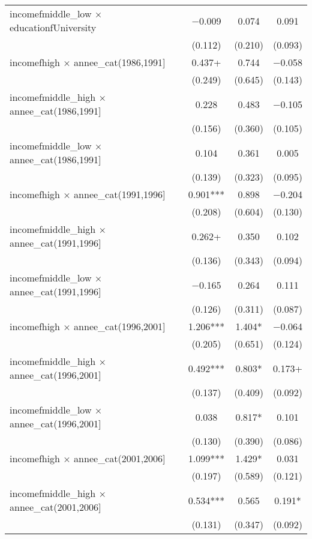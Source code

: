 \begin{table}
\begin{tabular}[t]{lccc}
incomefmiddle\_low × educationfUniversity & \num{-0.009} & \num{0.074} & \num{0.091}\\
 & (\num{0.112}) & (\num{0.210}) & (\num{0.093})\\
incomefhigh × annee\_cat(1986,1991] & \num{0.437}+ & \num{0.744} & \num{-0.058}\\
 & (\num{0.249}) & (\num{0.645}) & (\num{0.143})\\
incomefmiddle\_high × annee\_cat(1986,1991] & \num{0.228} & \num{0.483} & \num{-0.105}\\
 & (\num{0.156}) & (\num{0.360}) & (\num{0.105})\\
incomefmiddle\_low × annee\_cat(1986,1991] & \num{0.104} & \num{0.361} & \num{0.005}\\
 & (\num{0.139}) & (\num{0.323}) & (\num{0.095})\\
incomefhigh × annee\_cat(1991,1996] & \num{0.901}*** & \num{0.898} & \num{-0.204}\\
 & (\num{0.208}) & (\num{0.604}) & (\num{0.130})\\
incomefmiddle\_high × annee\_cat(1991,1996] & \num{0.262}+ & \num{0.350} & \num{0.102}\\
 & (\num{0.136}) & (\num{0.343}) & (\num{0.094})\\
incomefmiddle\_low × annee\_cat(1991,1996] & \num{-0.165} & \num{0.264} & \num{0.111}\\
 & (\num{0.126}) & (\num{0.311}) & (\num{0.087})\\
incomefhigh × annee\_cat(1996,2001] & \num{1.206}*** & \num{1.404}* & \num{-0.064}\\
 & (\num{0.205}) & (\num{0.651}) & (\num{0.124})\\
incomefmiddle\_high × annee\_cat(1996,2001] & \num{0.492}*** & \num{0.803}* & \num{0.173}+\\
 & (\num{0.137}) & (\num{0.409}) & (\num{0.092})\\
incomefmiddle\_low × annee\_cat(1996,2001] & \num{0.038} & \num{0.817}* & \num{0.101}\\
 & (\num{0.130}) & (\num{0.390}) & (\num{0.086})\\
incomefhigh × annee\_cat(2001,2006] & \num{1.099}*** & \num{1.429}* & \num{0.031}\\
 & (\num{0.197}) & (\num{0.589}) & (\num{0.121})\\
incomefmiddle\_high × annee\_cat(2001,2006] & \num{0.534}*** & \num{0.565} & \num{0.191}*\\
 & (\num{0.131}) & (\num{0.347}) & (\num{0.092})\\

\end{tabular}
\end{table}
